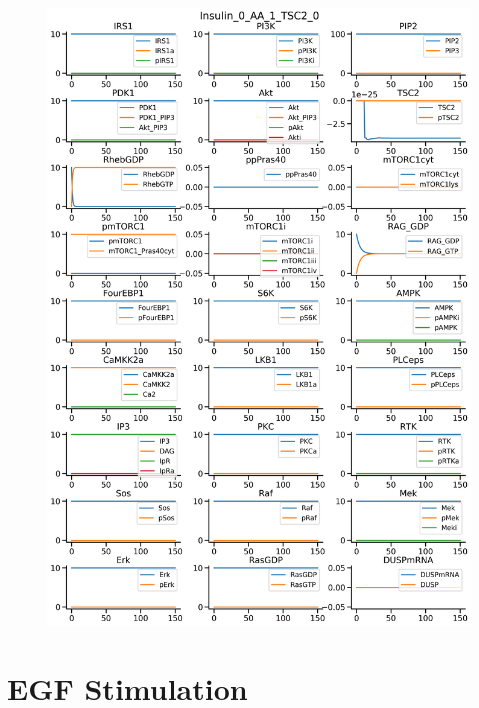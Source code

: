 \documentclass{beamer}
\begin{document}
\begin{frame}
\begin{figure}
\begin{minipage}{0.45\textwidth}
        \centering
        \includegraphics[width=\textwidth]{../simulations/ExtendedPI3KModel/validations/AAWithInsulinAndTSC2KO/Insulin_0_AA_1_TSC2_0-0.png}
    \end{minipage}
\end{figure}
\end{frame}

\section{EGF Stimulation} %
\end{document}
